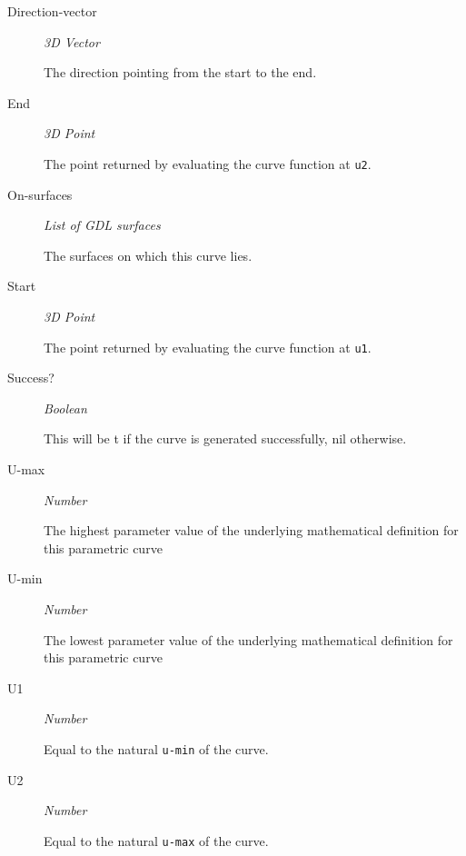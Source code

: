 \documentclass [11pt]{book}
\begin{document}
\begin{itemize}
\begin{description}
\item [Direction-vector]
\emph{3D Vector}

 The direction pointing from the start to the end.




\item [End]
\emph{3D Point}

 The point returned by evaluating the curve function at \texttt{u2}.




\item [On-surfaces]
\emph{List of GDL surfaces}

 The surfaces on which this curve lies.




\item [Start]
\emph{3D Point}

 The point returned by evaluating the curve function at \texttt{u1}.




\item [Success?]
\emph{Boolean}

 This will be t if the curve is generated successfully, nil otherwise.




\item [U-max]
\emph{Number}

 The highest parameter value of the underlying mathematical definition for this parametric curve




\item [U-min]
\emph{Number}

 The lowest parameter value of the underlying mathematical definition for this parametric curve




\item [U1]
\emph{Number}

 Equal to the natural \texttt{u-min} of the curve.




\item [U2]
\emph{Number}

 Equal to the natural \texttt{u-max} of the curve.




\end{description}







\end{itemize}
\end{document}

